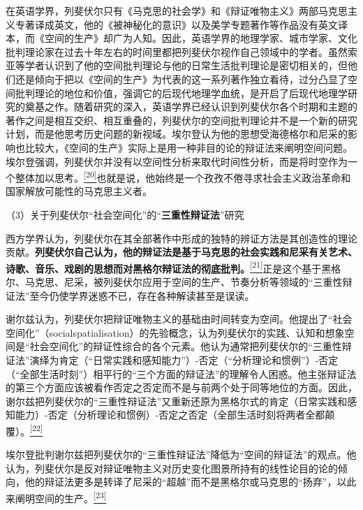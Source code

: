 \documentclass[UTF8, fontset = sourcesans, a4paper, oneside, zihao =
-4, scheme=chinese, no-math, space=true]{ctexbook}
\begin{document}
在英语学界，列斐伏尔只有《马克思的社会学》和《辩证唯物主义》两部马克思主义专著译成英文，他的《被神秘化的意识》以及美学专题著作等作品没有英文译本，而《空间的生产》却广为人知。因此，英语学界的地理学家、城市学家、文化批判理论家在过去十年左右的时间里都把列斐伏尔视作自己领域中的学者。虽然索亚等学者认识到了他的空间批判理论与他的日常生活批判理论是密切相关的，但他们还是倾向于把以《空间的生产》为代表的这一系列著作独立看待，过分凸显了空间批判理论的地位和价值，强调它的后现代地理学血统，是开启了后现代地理学研究的奠基之作。随着研究的深入，英语学界已经认识到列斐伏尔各个时期和主题的著作之间是相互交织、相互重叠的，列斐伏尔的空间批判理论并不是一个新的研究计划，而是他思考历史问题的新视域。埃尔登认为他的思想受海德格尔和尼采的影响也比较大，《空间的生产》实际上是用一种非目的论的辩证法来阐明空间问题。埃尔登强调，列斐伏尔并没有以空间性分析来取代时间性分析，而是将时空作为一个整体加以思考。\protect\hypertarget{part0004.htmlux5cux23w20}{}{}\protect\hyperlink{part0004.htmlux5cux23m20}{\textsuperscript{{[}20{]}}}也就是说，他始终是一个孜孜不倦寻求社会主义政治革命和国家解放可能性的马克思主义者。

（3）关于列斐伏尔``社会空间化''的``\textbf{三重性辩证法}''研究

西方学界认为，列斐伏尔在其全部著作中形成的独特的辨证方法是其创造性的理论贡献。\textbf{列斐伏尔自己认为，他的辩证法是基于马克思的社会实践和尼采有关艺术、诗歌、音乐、戏剧的思想而对黑格尔辩证法的彻底批判。}\protect\hypertarget{part0004.htmlux5cux23w21}{}{}\protect\hyperlink{part0004.htmlux5cux23m21}{\textsuperscript{{[}21{]}}}正是这个基于黑格尔、马克思、尼采，被列斐伏尔应用于空间的生产、节奏分析等领域的``三重性辩证法''至今仍使学界迷惑不已，存在各种解读甚至是误读。

谢尔兹认为，列斐伏尔把辩证唯物主义的基础由时间转变为空间。他提出了``社会空间化''（socialspatialisation）的先验概念，认为列斐伏尔的实践、认知和想象空间是``社会空间化''的辩证性综合的各个元素。他认为通常把列斐伏尔的``三重性辩证法''演绎为肯定（``日常实践和感知能力''）-否定（``分析理论和惯例''）-否定（``全部生活时刻''）相平行的``三个方面的辩证法''的理解令人困惑。他主张辩证法的第三个方面应该被看作否定之否定而不是与前两个处于同等地位的方面。因此，谢尔兹把列斐伏尔的``三重性辩证法''又重新还原为黑格尔式的肯定（日常实践和感知能力）-否定（分析理论和惯例）-否定之否定（全部生活时刻将两者全都颠覆）。\protect\hypertarget{part0004.htmlux5cux23w22}{}{}\protect\hyperlink{part0004.htmlux5cux23m22}{\textsuperscript{{[}22{]}}}

埃尔登批判谢尔兹把列斐伏尔的``三重性辩证法''降低为``空间的辩证法''的观点。他认为，列斐伏尔是反对辩证唯物主义对历史变化图景所持有的线性论目的论的倾向，他的辩证法更多是转译了尼采的``超越''而不是黑格尔或马克思的``扬弃''，以此来阐明空间的生产。\protect\hypertarget{part0004.htmlux5cux23w23}{}{}\protect\hyperlink{part0004.htmlux5cux23m23}{\textsuperscript{{[}23{]}}}
\end{document}
